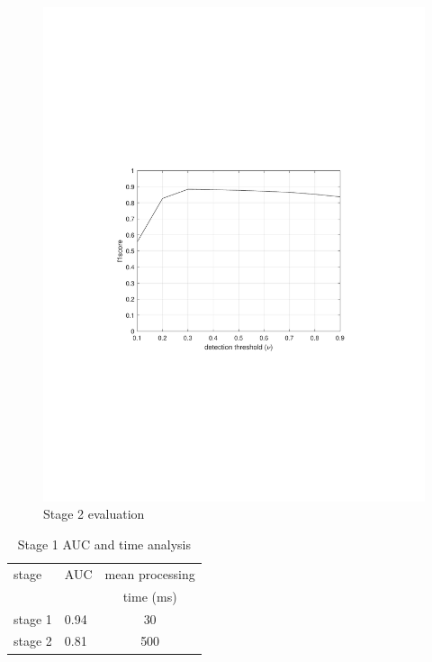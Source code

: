 \begin{figure}
    \centering
    \includegraphics[width=\linewidth,trim={100 240 100 250},clip]{images/f1-analysis-s2}
    \caption{Stage 2 evaluation}
    \label{fig:f1-analysis-s2}
\end{figure}



\begin{table}
\centering
\caption{Stage 1 AUC and time analysis} \vspace{5pt}
\label{table:auc-time-analysis-s1}
\begin{tabular}{|l|l|c|}
\hline
stage   	& AUC     & mean processing \\
            &         &  time (ms)  \\ \hline \hline
stage 1     & 0.94    & 30    \\ \hline
stage 2     & 0.81    & 500  \\ \hline
\end{tabular}
\end{table}


